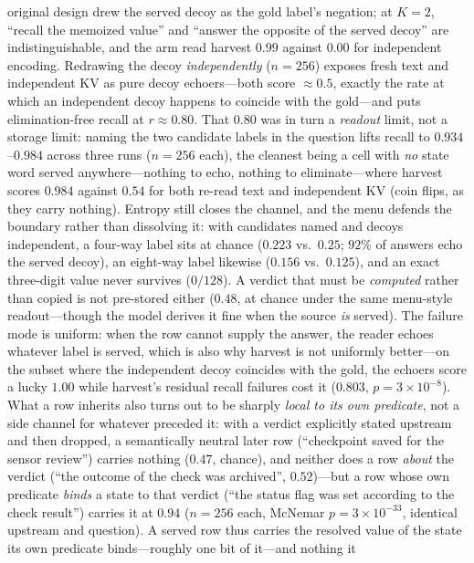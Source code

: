 \documentclass{article} %
\begin{document}
original design drew the served decoy as the gold label's negation; at $K{=}2$, ``recall the
memoized value'' and ``answer the opposite of the served decoy'' are indistinguishable, and
the arm read harvest $0.99$ against $0.00$ for independent encoding. Redrawing the decoy
\emph{independently} ($n{=}256$) exposes fresh text and independent KV as pure decoy
echoers---both score ${\approx}0.5$, exactly the rate at which an independent decoy happens
to coincide with the gold---and puts elimination-free recall at $r{\approx}0.80$. That $0.80$
was in turn a \emph{readout} limit, not a storage limit: naming the two candidate labels in
the question lifts recall to $0.934$--$0.984$ across three runs ($n{=}256$ each), the
cleanest being a cell with \emph{no} state word served anywhere---nothing to echo, nothing to
eliminate---where harvest scores $0.984$ against $0.54$ for both re-read text and independent
KV (coin flips, as they carry nothing). Entropy still closes the channel, and the menu
defends the boundary rather than dissolving it: with candidates named and decoys independent,
a four-way label sits at chance ($0.223$ vs.\ $0.25$; $92\%$ of answers echo the served
decoy), an eight-way label likewise ($0.156$ vs.\ $0.125$), and an exact three-digit value
never survives ($0/128$). A verdict that must be \emph{computed} rather than copied is not
pre-stored either ($0.48$, at chance under the same menu-style readout---though the model
derives it fine when the source \emph{is} served). The failure mode is uniform: when the row
cannot supply the answer, the reader echoes whatever label is served, which is also why
harvest is not uniformly better---on the subset where the independent decoy coincides with
the gold, the echoers score a lucky $1.00$ while harvest's residual recall failures cost it
($0.803$, $p{=}3{\times}10^{-8}$). What a row inherits also turns out to be sharply
\emph{local to its own predicate}, not a side channel for whatever preceded it: with a
verdict explicitly stated upstream and then dropped, a semantically neutral later row
(``checkpoint saved for the sensor review'') carries nothing ($0.47$, chance), and neither
does a row \emph{about} the verdict (``the outcome of the check was archived'', $0.52$)---but
a row whose own predicate \emph{binds} a state to that verdict (``the status flag was set
according to the check result'') carries it at $0.94$ ($n{=}256$ each, McNemar
$p{=}3{\times}10^{-33}$, identical upstream and question). A served row thus carries the
resolved value of the state its own predicate binds---roughly one bit of it---and nothing it
\end{document}

